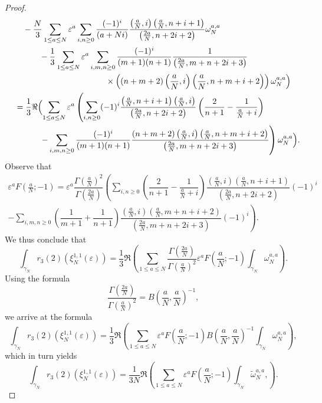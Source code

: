 \documentclass[11pt,a4,leqno]{amsart}
\theoremstyle{my theoremstyle}
\theoremstyle{dfn}
\theoremstyle{remark}
\renewcommand{\1}{\mathbbm{1}}
\newcommand{\e}{\varepsilon}
\numberwithin{equation}{section}
\begin{document}
\begin{proof}
\begin{align*}
& \qquad -\frac{N}{3} \sum_{1 \leq a \leq N} \e^a \sum_{i, n \ge 0} \dfrac{(-1)^i}{(a+Ni)} \dfrac{\left(\frac{a}N, i \right)\left(\frac{a}N, n+i+1 \right)}{\left(\frac{2a}N, n+2i+2 \right)}
\omega_N^{a, a} \\
& \qquad\qquad -\frac{1}{3}  \sum_{1 \leq a \leq N} \e^a  \sum_{i, m, n \ge 0}\dfrac{(-1)^i}{(m+1)(n+1)} \dfrac{1}{\left(\frac{2a}N, m+n+2i+3 \right)} \\
& \qquad\qquad\qquad\qquad\qquad\qquad \times \left((n+m+2)\left(\frac{a}N, i \right)\left(\frac{a}N, n+m+i+2 \right) \right) \omega_N^{a, a} \Bigr) \\
& \quad = \frac{1}{3} \Re \Bigl(  \sum_{1 \leq a \leq N} \e^a \left( \sum_{i, n \ge 0} (-1)^i \dfrac{\left(\frac{a}N, n+i+1 \right)\left(\frac{a}N, i \right)}{\left(\frac{2a}N, n+2i+2 \right)} \left( \dfrac{2}{n+1} - \dfrac{1}{\frac{a}{N}+i}\right) \right. \\
& \qquad\qquad \left. - \sum_{i, m, n \ge 0}\dfrac{(-1)^i}{(m+1)(n+1)} \dfrac{(n+m+2)\left(\frac{a}N, i \right)\left(\frac{a}N, n+m+i+2 \right)}{\left(\frac{2a}N, m+n+2i+3 \right)} \right)\omega_N^{a, a} \Bigr).
\end{align*}
Observe that 
\begin{multline*}
\e^{a} F\left( \frac{a}{N} ; -1 \right) =\e^a \dfrac{\Gamma\left(\frac{a}{N} \right)^2}{\Gamma\left(\frac{2a}{N} \right)} \left( \sum_{i, n \ge 0} \left(\dfrac{2}{n+1} - \dfrac{1}{\frac{a}{N}+i} \right) \dfrac{(\frac{a}{N}, i)(\frac{a}{N}, n+i+1)}{(\frac{2a}{N}, n+2i+2)} (-1)^i \right. \\
 \left. -\sum_{i, m, n \ge 0} \left(\dfrac1{m+1}+ \dfrac1{n+1} \right) \dfrac{(\frac{a}{N}, i)(\frac{a}{N}, m+n+i+2) }{(\frac{2a}{N}, m+n+2i+3)} (-1)^i  \right).
\end{multline*}
We thus conclude that
\[
\int_{\gamma_N}r_3(2)(\xi_N^{1,1}(\e)) =\frac{1}{3} \Re  \left(\sum_{1 \leq a \leq N} \dfrac{\Gamma\left(\frac{2a}{N} \right)}{\Gamma\left(\frac{a}{N} \right)^2} \e^a F\left( \frac{a}{N} ; -1 \right) \int_{\gamma_N} \omega_N^{a, a} \right).
\]
Using the formula $$\dfrac{\Gamma\left(\frac{2a}{N} \right)}{\Gamma\left(\frac{a}{N} \right)^2}=B\left( \frac{a}{N}, \frac{a}{N}\right)^{-1},$$ we arrive at the formula
\[
\int_{\gamma_N} r_3(2)(\xi_N^{1,1}(\e)) =\frac{1}{3} \Re  \left(\sum_{1 \leq a \leq N} \e^a F\left( \frac{a}{N} ; -1 \right) B\left( \frac{a}{N}, \frac{a}{N}\right)^{-1} \int_{\gamma_N} \omega_N^{a, a} \right),
\]
which in turn yields 
\begin{equation}\label{eq:gammaN_reg_hyper}
\int_{\gamma_N} r_3(2)(\xi_N^{1,1}(\e)) =\frac{1}{3N} \Re  \left(\sum_{1 \leq a \leq N} \e^a F\left( \frac{a}{N} ; -1 \right) \int_{\gamma_N}\tilde{\omega}_N^{a, a}, \right).

\end{equation}
\end{proof}
\end{document}
